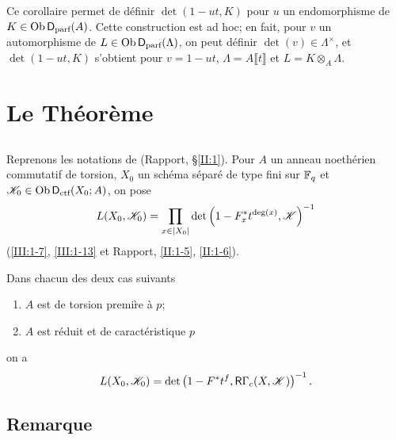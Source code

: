 Ce corollaire permet de d\'efinir $\det(1-u t,K)$ pour $u$ un endomorphisme de 
$K\in \operatorname{Ob}\mathsf{D}_\text{parf}(A)$. Cette construction est ad hoc; en fait, pour $v$ un 
automorphisme de $L\in\operatorname{Ob}\mathsf{D}_\text{parf}(\Lambda)$, on peut d\'efinir 
$\det(v)\in\Lambda^\times$, et $\det(1-u t,K)$ s'obtient pour $v=1-u t$, 
$\Lambda=A\llbracket t\rrbracket$ et $L=K\otimes_A\Lambda$. 










\section{Le Th\'eor\`eme}\label{III:2}





\subsection{}\label{III:2-1}

Reprenons les notations de (Rapport, \S\ref{II:1}). Pour $A$ un anneau 
noeth\'erien commutatif de torsion, $X_0$ un sch\'ema s\'epar\'e de type fini sur 
$\mathbb{F}_q$ et $\mathscr{K}_0\in\operatorname{Ob}\mathsf{D}_\text{ctf}(X_0;A)$, on pose 
\[
  L(X_0,\mathscr{K}_0) = \prod_{x\in |X_0|} \det\left(1-F_x^* t^{\deg(x)}, \mathscr{K}\right)^{-1}
\]
(\ref{III:1-7}, \ref{III:1-13} et Rapport, \ref{II:1-5}, \ref{II:1-6}). 





\begin{theorem_}\label{III:2-2}
Dans chacun des deux cas suivants
\begin{enumerate}[\indent a)]
  \item $A$ est de torsion premi\`re \`a $p$;
  \item $A$ est r\'eduit et de caract\'eristique $p$
\end{enumerate}
on a 
\begin{equation}\label{III:eq:2-2-1}
  L(X_0,\mathscr{K}_0) = \det\left(1-F^* t^f, \mathsf{R}\Gamma_c(X,\mathscr{K})\right)^{-1} \text{.}
\end{equation}
\end{theorem_}





\subsection{Remarque}\label{III:2-3}

